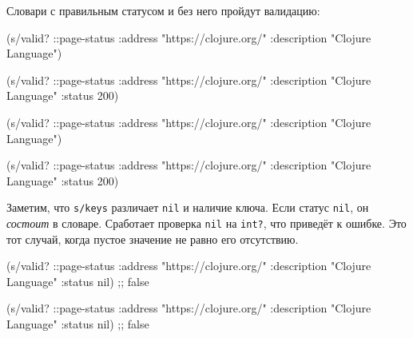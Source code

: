 Словари с правильным статусом и без него пройдут валидацию:

\ifx\devicetype\mobile

\begin{english}
  \begin{clojure}
(s/valid? ::page-status
  {:address "https://clojure.org/"
   :description "Clojure Language"})

(s/valid? ::page-status
  {:address "https://clojure.org/"
   :description "Clojure Language"
   :status 200})
  \end{clojure}
\end{english}

\else

\begin{english}
  \begin{clojure}
(s/valid? ::page-status
          {:address "https://clojure.org/"
           :description "Clojure Language"})

(s/valid? ::page-status
          {:address "https://clojure.org/"
           :description "Clojure Language"
           :status 200})
  \end{clojure}
\end{english}

\fi


Заметим, что \verb|s/keys| различает \verb|nil| и наличие ключа. Если статус
\verb|nil|, он \emph{состоит} в словаре. Сработает проверка \verb|nil| на
\verb|int?|, что приведёт к ошибке. Это тот случай, когда пустое значение
не равно его отсутствию.

\ifx\devicetype\mobile

\begin{english}
  \begin{clojure}
(s/valid? ::page-status
  {:address "https://clojure.org/"
   :description "Clojure Language"
   :status nil})
;; false
  \end{clojure}
\end{english}

\else

\begin{english}
  \begin{clojure}
(s/valid? ::page-status
          {:address "https://clojure.org/"
           :description "Clojure Language"
           :status nil})
;; false
  \end{clojure}
\end{english}

\fi

